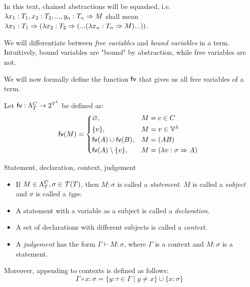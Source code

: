 \documentclass[main.tex]{subfiles}
\begin{document}
\begin{convention}
    In this text, chained abstractions will be squashed, i.e.
    $\lambda x_1 : T_1, x_2: T_2, ..., y_n: T_n \abstr M$ shall mean
    $\lambda x_1 : T_1 \abstr (\lambda x_2: T_2 \abstr (... (\lambda x_n: T_n \abstr M) ...))$.
\end{convention}

We will differentiate between \emph{free variables} and \emph{bound variables}
in a term. Intuitively, bound variables are "bound" by abstraction, while
free variables are not.

We will now formally define the function $\fvv$ that gives us all free variables of a
term.
\begin{defn}
    Let $\fvv : \plambda{T}{C} \rightarrow 2^{\lvars}$ be defined as:
    \[
        \fv{M} =
        \begin{cases*}
            \varnothing ,& $M = c \in C$ \\
            \{ v \} ,& $M = v \in \lvars$ \\
            \fv{A} \cup \fv{B} ,& $M = (AB)$ \\
            \fv{A} \setminus \{ v \} ,& $M = (\lambda v : \sigma \abstr A)$ \\
        \end{cases*}
    \]
\end{defn}

\begin{defn}
    \label{def:context}
    Statement, declaration, context, judgement \cite[chap.~2.4]{ttfp}
    \begin{itemize}
        \item If $M \in \plambda{T}{C}, \sigma \in \tclos{T}$, then $M : \sigma$ is called
            a \emph{statement}. $M$ is called a \emph{subject} and $\sigma$
            is called a \emph{type}.
        \item A statement with a variable as a subject is called a \emph{declaration}.
        \item A set of declarations with different subjects is called a \emph{context}.
        \item A \emph{judgement} has the form $\Gamma \vdash M: \sigma$, where
            $\Gamma$ is a context and $M: \sigma$ is a statement.
    \end{itemize}

    Moreover, appending to contexts is defined as follows:
    \[ \Gamma \circ x : \sigma = \{ y : \tau \in \Gamma \mid y \neq x \}
       \cup \{ x : \sigma \} \]
\end{defn}
\end{document}
